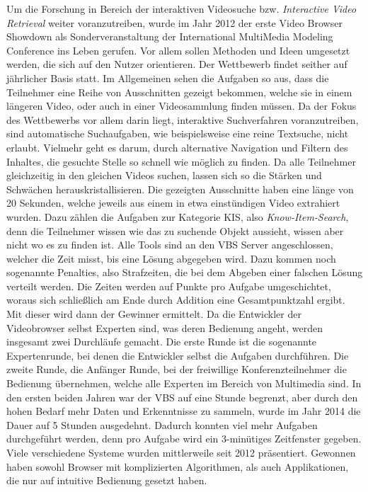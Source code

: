 \documentclass[11pt,a4paper]{report}
\begin{document}
Um die Forschung in Bereich der interaktiven Videosuche bzw. \emph{Interactive Video Retrieval} weiter voranzutreiben, wurde im Jahr 2012 der erste Video Browser Showdown als Sonderveranstaltung der International MultiMedia Modeling Conference ins Leben gerufen. Vor allem sollen Methoden und Ideen umgesetzt werden, die sich auf den Nutzer orientieren. Der Wettbewerb findet seither auf jährlicher Basis statt. Im Allgemeinen sehen die Aufgaben so aus, dass die Teilnehmer eine Reihe von Ausschnitten gezeigt bekommen, welche sie in einem längeren Video, oder auch in einer Videosammlung finden müssen. Da der Fokus des Wettbewerbs vor allem darin liegt, interaktive Suchverfahren voranzutreiben, sind automatische Suchaufgaben, wie beispielsweise eine reine Textsuche, nicht erlaubt. Vielmehr geht es darum, durch alternative Navigation und Filtern des Inhaltes, die gesuchte Stelle so schnell wie möglich zu finden. Da alle Teilnehmer gleichzeitig in den gleichen Videos suchen, lassen sich so die Stärken und Schwächen herauskristallisieren. Die gezeigten Ausschnitte haben eine länge von 20 Sekunden, welche jeweils aus einem in etwa einstündigen Video extrahiert wurden. Dazu zählen die Aufgaben zur Kategorie KIS, also  \emph{Know-Item-Search}, denn die Teilnehmer wissen wie das zu suchende Objekt aussieht, wissen aber nicht wo es zu finden ist. Alle Tools sind an den VBS Server angeschlossen, welcher die Zeit misst, bis eine Lösung abgegeben wird. Dazu kommen noch sogenannte Penalties, also Strafzeiten, die bei dem Abgeben einer falschen Lösung verteilt werden. Die Zeiten werden auf Punkte pro Aufgabe umgeschichtet, woraus sich schließlich am Ende durch Addition eine Gesamtpunktzahl ergibt. Mit dieser wird dann der Gewinner ermittelt. Da die Entwickler der Videobrowser selbst Experten sind, was deren Bedienung angeht, werden insgesamt zwei Durchläufe gemacht. Die erste Runde ist die sogenannte Expertenrunde, bei denen die Entwickler selbst die Aufgaben durchführen. Die zweite Runde, die Anfänger Runde, bei der freiwillige Konferenzteilnehmer die Bedienung übernehmen, welche alle Experten im Bereich von Multimedia sind. In den ersten beiden Jahren war der VBS auf eine Stunde begrenzt, aber durch den hohen Bedarf mehr Daten und Erkenntnisse zu sammeln, wurde im Jahr 2014 die Dauer auf 5 Stunden ausgedehnt. Dadurch konnten viel mehr Aufgaben durchgeführt werden, denn pro Aufgabe wird ein 3-minütiges Zeitfenster gegeben. Viele verschiedene Systeme wurden mittlerweile seit 2012 präsentiert. Gewonnen haben sowohl Browser mit komplizierten Algorithmen, als auch Applikationen, die nur auf intuitive Bedienung gesetzt haben. \cite{schoeffmann2014video} \cite{schoeffmann2014user}
\end{document}
